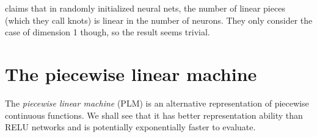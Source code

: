 \documentclass{article}
\newcommand{\defn}[1]{\textit{#1}}
\newcommand{\R}{\mathbb{R}}
\newcommand{\wnn}{W}
\newcommand{\x}{\mathbf{x}}
\newcommand{\f}{f}
\newcommand{\fstar}{\f^*}
\newcommand{\fhat}{{\hat\f}}
\newcommand{\fnn}{{\fhat^\textit{NN}}}
\newcommand{\act}{\sigma}
\newcommand{\relu}{\act_R}
\begin{document}
\citet{chen2016knots,chen2016empirical,chen2016upper} claims that in randomly initialized neural nets,
the number of linear pieces (which they call knots) is linear in the number of neurons.
They only consider the case of dimension 1 though, so the result seems trivial.


%

\section{The piecewise linear machine}

The \defn{piecewise linear machine} (PLM) is an alternative representation of piecewise continuous functions.
We shall see that it has better representation ability than RELU networks and is potentially exponentially faster to evaluate.
\end{document}
